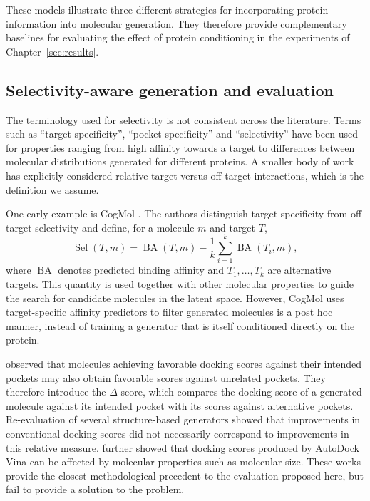 \documentclass[a4paper,12pt]{article}
\begin{document}
These models illustrate three different strategies for incorporating protein
information into molecular generation. They therefore provide complementary
baselines for evaluating the effect of protein conditioning in the experiments
of Chapter~\ref{sec:results}.

\subsection{Selectivity-aware generation and evaluation}
\label{sec:related_selectivity}
The terminology used for selectivity is not consistent across the
literature. Terms such as ``target specificity'', ``pocket specificity''
and ``selectivity'' have been used for properties ranging from high affinity
towards a target to differences between molecular distributions generated for
different proteins. A smaller body of work has explicitly considered relative
target-versus-off-target interactions, which is the definition we assume.

One early example is CogMol
\parencite{Chenthamarakshan_Das_Hoffman_2020}. The authors distinguish target
specificity from off-target selectivity and define, for a molecule $m$ and
target $T$,
\begin{equation*}
    \operatorname{Sel}(T,m)
    =
    \operatorname{BA}(T,m)
    -
    \frac{1}{k}
    \sum_{i=1}^{k}
    \operatorname{BA}(T_i,m),
\end{equation*}
where $\operatorname{BA}$ denotes predicted binding affinity and
$T_1,\ldots,T_k$ are alternative targets. This quantity is used together with
other molecular properties to guide the search for candidate molecules in the
latent space. However, CogMol uses target-specific affinity predictors to filter generated molecules
is a post hoc manner, instead of training a generator that is itself
conditioned directly on the protein.

\textcite{Gao_Ren_Ni_2024} observed that molecules achieving
favorable docking scores against their intended pockets may also obtain
favorable scores against unrelated pockets. They therefore introduce the
$\Delta$ score, which compares the docking score of a generated molecule
against its intended pocket with its scores against alternative pockets.
Re-evaluation of several structure-based generators showed that improvements
in conventional docking scores did not necessarily correspond to improvements
in this relative measure. \textcite{Gao_Tan_Huang_2024} further showed that
docking scores produced by AutoDock Vina can be affected by molecular
properties such as molecular size. These works provide the closest
methodological precedent to the evaluation proposed here, but fail to provide a solution to the problem.
\end{document}
